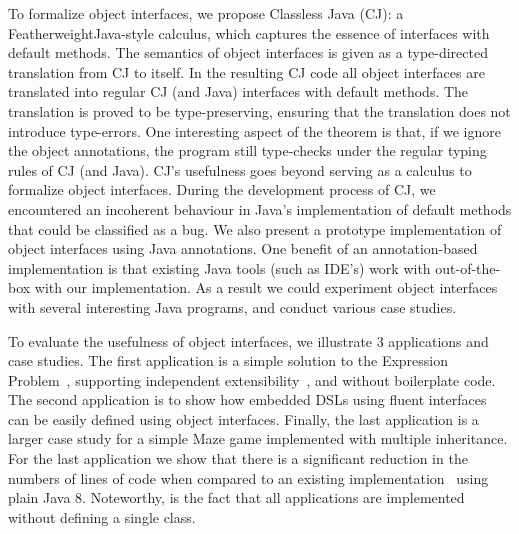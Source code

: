 To formalize object interfaces, we propose Classless Java (CJ): 
a FeatherweightJava-style calculus, which captures the essence 
of interfaces with default methods. The semantics of object interfaces 
is given as a type-directed translation from CJ to itself. 
In the resulting CJ code all object interfaces are translated into 
regular CJ (and Java) interfaces with default methods. The translation 
is proved to be type-preserving, ensuring that the translation does 
not introduce type-errors. One interesting aspect of the theorem is that, 
if we ignore the object annotations, the program still type-checks 
under the regular typing rules of CJ (and Java).
CJ's usefulness goes beyond serving as a calculus to formalize object
interfaces. During the development process of CJ, we encountered an 
incoherent behaviour in Java's implementation of default methods that 
could be classified as a bug. 
We also present a prototype implementation of object interfaces using
Java annotations. One benefit of an annotation-based implementation 
is that existing Java tools (such as IDE's) work with out-of-the-box
with our implementation. As a result we could experiment object
interfaces with several interesting Java programs, and conduct various
case studies. 


To evaluate the usefulness of object interfaces, we illustrate 3
applications and case studies. The first application is a simple 
solution to the Expression Problem~\cite{wadler98expression}, supporting independent 
extensibility~\cite{zenger05independentlyextensible}, and without boilerplate code. The second
application is to show how embedded DSLs using fluent interfaces~\cite{} 
can be easily defined using object interfaces. Finally, the last
application is a larger case study for a simple Maze game implemented with 
multiple inheritance. For the last application we show that there is a
significant reduction in the numbers of lines of code when compared 
to an existing implementation~\cite{bono14} using plain Java 8. 
Noteworthy, is the fact that all applications are implemented 
without defining a single class.

